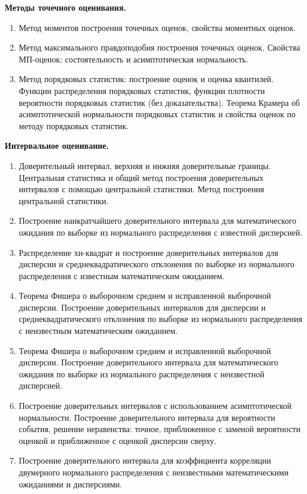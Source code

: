 \documentclass[a4paper,12pt]{article}
\newcommand{\theme}[1]{\hfil \textbf{#1} \hfil}
\begin{document}
\theme{Методы точечного оценивания.}
\begin{enumerate}[resume]
    \item \label{estm:mom} Метод моментов построения точечных оценок, свойства моментных оценок.
    \item \label{estm:ml} Метод максимального правдоподобия построения точечных оценок. Свойства МП-оценок: состоятельность и асимптотическая нормальность.
    \item \label{estm:vs} Метод порядковых статистик: построение оценок и оценка квантилей. Функции распределения порядковых статистик, функции плотности вероятности порядковых статистик (без доказательства). Теорема Крамера об асимптотической нормальности порядковых статистик и свойства оценок по методу порядковых статистик.
\end{enumerate}


\theme{Интервальное оценивание.}
\begin{enumerate}[resume]
    \item \label{int:cs} Доверительный интервал, верхняя и нижняя доверительные границы. Центральная статистика и общий метод построения доверительных интервалов с помощью центральной статистики. Метод построения центральной статистики.
    \item \label{int:exp-kn} Построение наикратчайшего доверительного интервала для математического ожидания по выборке из нормального распределения с известной дисперсией.
    \item \label{int:var-kn} Распределение хи-квадрат и построение доверительных интервалов для дисперсии и среднеквадратического отклонения по выборке из нормального распределения с известным математическим ожиданием.
    \item \label{int:var-unkn} Теорема Фишера о выборочном среднем и исправленной выборочной дисперсии. Построение доверительных интервалов для дисперсии и среднеквадратического отклонения по выборке из нормального распределения с неизвестным математическим ожиданием.
    \item \label{int:exp-unkn} Теорема Фишера о выборочном среднем и исправленной выборочной дисперсии. Построение доверительного интервала для математического ожидания по выборке из нормального распределения с неизвестной дисперсией.
    \item \label{int:asy} Построение доверительных интервалов с использованием асимптотической нормальности. Построение доверительного интервала для вероятности события, решение неравенства: точное, приближенное с заменой вероятности оценкой и приближенное с оценкой дисперсии сверху.
    \item \label{int:cor} Построение доверительного интервала для коэффициента корреляции двумерного нормального распределения с неизвестными математическими ожиданиями и дисперсиями.
\end{enumerate}
\end{document}
